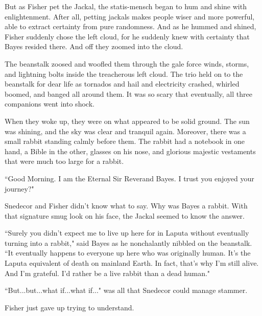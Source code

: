 \documentclass{article}
\begin{document}
But as Fisher pet the Jackal, the statis-mensch began to hum and shine with enlightenment. After all, petting jackals makes people wiser and more powerful, able to extract certainty from pure randomness. And as he hummed and shined, Fisher suddenly chose the left cloud, for he suddenly knew with certainty that Bayes resided there. And off they zoomed into the cloud. \newline

The beanstalk zoosed and woofled them through the gale force winds, storms, and lightning bolts inside the treacherous left cloud. The trio held on to the beanstalk for dear life as tornados and hail and electricity crashed, whirled boomed, and banged all around them. It was so scary that eventually, all three companions went into shock. \newline \newline



When they woke up, they were on what appeared to be solid ground. The sun was shining, and the sky was clear and tranquil again. Moreover, there was a small rabbit standing calmly before them. The rabbit had a notebook in one hand, a Bible in the other, glasses on his nose, and glorious majestic vestaments that were much too large for a rabbit. \newline

``Good Morning. I am the Eternal Sir Reverand Bayes. I trust you enjoyed your journey?" \newline

Snedecor and Fisher didn't know what to say. Why was Bayes a rabbit. With that signature smug look on his face, the Jackal seemed to know the answer.  \newline

``Surely you didn't expect me to live up here for in Laputa without eventually turning into a rabbit," said Bayes as he nonchalantly nibbled on the beanstalk. ``It eventually happens to everyone up here who was originally human. It's the Laputa equivalent of death on mainland Earth. In fact, that's why I'm still alive. And I'm grateful. I'd rather be a live rabbit than a dead human." \newline

``But...but...what if...what if..." was all that Snedecor could manage stammer. \newline

Fisher just gave up trying to understand. \newline
\end{document}

